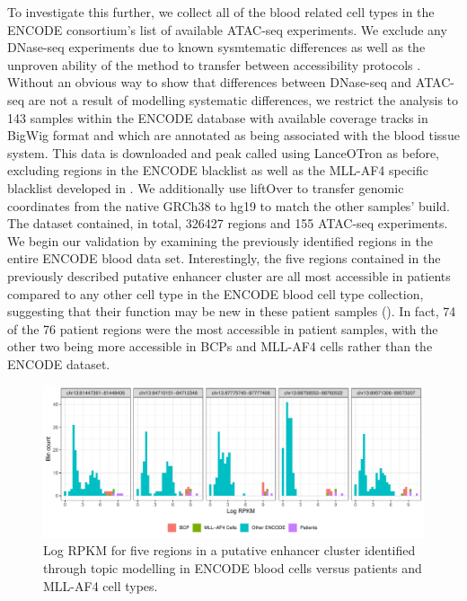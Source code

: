To investigate this further, we collect all of the blood related cell types in the ENCODE consortium's list of available ATAC-seq experiments. We exclude any DNase-seq experiments due to known sysmtematic differences as well as the unproven ability of the method to transfer between accessibility protocols \cite{Klemm2019a}. Without an obvious way to show that differences between DNase-seq and ATAC-seq are not a result of modelling systematic differences, we restrict the analysis to 143 samples within the ENCODE database with available coverage tracks in BigWig format and which are annotated as being associated with the blood tissue system. This data is downloaded and peak called using LanceOTron as before, excluding regions in the ENCODE blacklist as well as the MLL-AF4 specific blacklist developed in . We additionally use liftOver to transfer genomic coordinates from the native GRCh38 to hg19 to match the other samples' build. The dataset contained, in total, 326427 regions and 155 ATAC-seq experiments. We begin our validation by examining the previously identified regions in the entire ENCODE blood data set. Interestingly, the five regions contained in the previously described putative enhancer cluster are all most accessible in patients compared to any other cell type in the ENCODE blood cell type collection, suggesting that their function may be new in these patient samples (). In fact, 74 of the 76 patient regions were the most accessible in patient samples, with the other two being more accessible in BCPs and MLL-AF4 cells rather than the ENCODE dataset.

\begin{figure}
    \centering
    \includegraphics[width=\textwidth]{plot/ch5/pt_compared_to_encode.pdf}
    \caption{Log RPKM for five regions in a putative enhancer cluster identified through topic modelling in ENCODE blood cells versus patients and MLL-AF4 cell types.}
    \label{fig:encode_pt_regions}
\end{figure}

